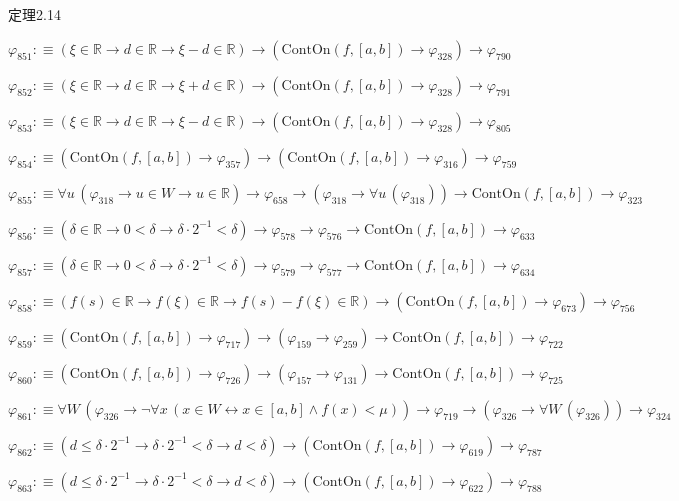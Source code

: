 \begin{fullproof}{定理2.14}
\begin{abbrevlist}
\item $\varphi_{851} :\equiv (\xi \in \mathbb{R} \to d \in \mathbb{R} \to \xi - d \in \mathbb{R}) \to (\mathrm{ContOn}(f,[a,b]) \to \varphi_{328}) \to \varphi_{790}$
\item $\varphi_{852} :\equiv (\xi \in \mathbb{R} \to d \in \mathbb{R} \to \xi + d \in \mathbb{R}) \to (\mathrm{ContOn}(f,[a,b]) \to \varphi_{328}) \to \varphi_{791}$
\item $\varphi_{853} :\equiv (\xi \in \mathbb{R} \to d \in \mathbb{R} \to \xi - d \in \mathbb{R}) \to (\mathrm{ContOn}(f,[a,b]) \to \varphi_{328}) \to \varphi_{805}$
\item $\varphi_{854} :\equiv (\mathrm{ContOn}(f,[a,b]) \to \varphi_{357}) \to (\mathrm{ContOn}(f,[a,b]) \to \varphi_{316}) \to \varphi_{759}$
\item $\varphi_{855} :\equiv \forall u\,(\varphi_{318} \to u \in W \to u \in \mathbb{R}) \to \varphi_{658} \to (\varphi_{318} \to \forall u\,(\varphi_{318})) \to \mathrm{ContOn}(f,[a,b]) \to \varphi_{323}$
\item $\varphi_{856} :\equiv (\delta \in \mathbb{R} \to 0 < \delta \to \delta \cdot 2^{-1} < \delta) \to \varphi_{578} \to \varphi_{576} \to \mathrm{ContOn}(f,[a,b]) \to \varphi_{633}$
\item $\varphi_{857} :\equiv (\delta \in \mathbb{R} \to 0 < \delta \to \delta \cdot 2^{-1} < \delta) \to \varphi_{579} \to \varphi_{577} \to \mathrm{ContOn}(f,[a,b]) \to \varphi_{634}$
\item $\varphi_{858} :\equiv (f(s) \in \mathbb{R} \to f(\xi) \in \mathbb{R} \to f(s) - f(\xi) \in \mathbb{R}) \to (\mathrm{ContOn}(f,[a,b]) \to \varphi_{673}) \to \varphi_{756}$
\item $\varphi_{859} :\equiv (\mathrm{ContOn}(f,[a,b]) \to \varphi_{717}) \to (\varphi_{159} \to \varphi_{259}) \to \mathrm{ContOn}(f,[a,b]) \to \varphi_{722}$
\item $\varphi_{860} :\equiv (\mathrm{ContOn}(f,[a,b]) \to \varphi_{726}) \to (\varphi_{157} \to \varphi_{131}) \to \mathrm{ContOn}(f,[a,b]) \to \varphi_{725}$
\item $\varphi_{861} :\equiv \forall W\,(\varphi_{326} \to \neg \forall x\,(x \in W \leftrightarrow x \in [a,b] \land f(x) < \mu)) \to \varphi_{719} \to (\varphi_{326} \to \forall W\,(\varphi_{326})) \to \varphi_{324}$
\item $\varphi_{862} :\equiv (d \leq \delta \cdot 2^{-1} \to \delta \cdot 2^{-1} < \delta \to d < \delta) \to (\mathrm{ContOn}(f,[a,b]) \to \varphi_{619}) \to \varphi_{787}$
\item $\varphi_{863} :\equiv (d \leq \delta \cdot 2^{-1} \to \delta \cdot 2^{-1} < \delta \to d < \delta) \to (\mathrm{ContOn}(f,[a,b]) \to \varphi_{622}) \to \varphi_{788}$

\end{abbrevlist}
\end{fullproof}
